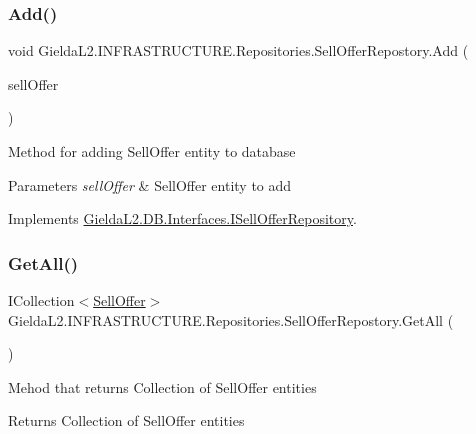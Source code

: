 \subsubsection{\texorpdfstring{Add()}{Add()}}
{\footnotesize\ttfamily void Gielda\+L2.\+I\+N\+F\+R\+A\+S\+T\+R\+U\+C\+T\+U\+R\+E.\+Repositories.\+Sell\+Offer\+Repostory.\+Add (\begin{DoxyParamCaption}\item[{\mbox{\hyperlink{class_gielda_l2_1_1_d_b_1_1_entities_1_1_sell_offer}{Sell\+Offer}}}]{sell\+Offer }\end{DoxyParamCaption})}



Method for adding Sell\+Offer entity to database 


\begin{DoxyParams}{Parameters}
{\em sell\+Offer} & Sell\+Offer entity to add\\
\hline
\end{DoxyParams}


Implements \mbox{\hyperlink{interface_gielda_l2_1_1_d_b_1_1_interfaces_1_1_i_sell_offer_repository_a18f7f7c3a677e89bdc055a6b4a6a248a}{Gielda\+L2.\+D\+B.\+Interfaces.\+I\+Sell\+Offer\+Repository}}.

\mbox{\label{class_gielda_l2_1_1_i_n_f_r_a_s_t_r_u_c_t_u_r_e_1_1_repositories_1_1_sell_offer_repostory_a1dbfc870dcfaa42e29a440635c7b30d1}} 
\subsubsection{\texorpdfstring{GetAll()}{GetAll()}}
{\footnotesize\ttfamily I\+Collection$<$\mbox{\hyperlink{class_gielda_l2_1_1_d_b_1_1_entities_1_1_sell_offer}{Sell\+Offer}}$>$ Gielda\+L2.\+I\+N\+F\+R\+A\+S\+T\+R\+U\+C\+T\+U\+R\+E.\+Repositories.\+Sell\+Offer\+Repostory.\+Get\+All (\begin{DoxyParamCaption}{ }\end{DoxyParamCaption})}



Mehod that returns Collection of Sell\+Offer entities 

\begin{DoxyReturn}{Returns}
Collection of Sell\+Offer entities
\end{DoxyReturn}


